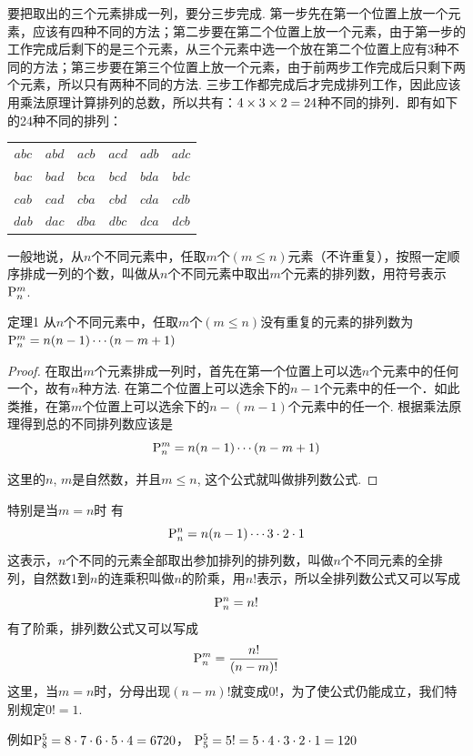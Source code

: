 \begin{solution}
要把取出的三个元素排成一列，要分三步完成. 第一步先在第一个位置上放一个元素，应该有四种不同的方法；第二步要在第二个位置上放一个元素，由于第一步的工作完成后剩下的是三个元素，从三个元素中选一个放在第二个位置上应有3种不同的方法；第三步要在第三个位置上放一个元素，由于前两步工作完成后只剩下两个元素，所以只有两种不同的方法. 三步工作都完成后才完成排列工作，因此应该用乘法原理计算排列的总数，所以共有：$4\times3\times2=24$种不同的排列．即有如下的24种不同的排列：
\begin{center}
\begin{tabular}{cccccc}
$abc$& $abd$& $acb$ &$acd$ &$adb$& $adc$\\
$bac$& $bad$ &$bca$& $bcd$ &$bda$& $bdc$\\
$cab$& $cad$ &$cba$& $cbd$ &$cda$& $cdb$\\
$dab$& $dac$& $dba$ &$dbc$& $dca$ &$dcb$    
\end{tabular}
\end{center}
\end{solution}

一般地说，从$n$个不同元素中，任取$m$个$(m\le n)$元素（不许重复），按照一定顺序排成一列的个数，叫做从$n$个不同元素中取出$m$个元素的排列数，用符号表示${\rm P}^{m}_{n}$.

\begin{blk}
  {定理1} 从$n$个不同元素中，任取$m$个$(m\le n)$没有重复的元素的排列数为${\rm P}^{m}_{n}=n(n-1)\cdots (n-m+1)$
\end{blk}

\begin{proof}
    在取出$m$个元素排成一列时，首先在第一个位置上可以选$n$个元素中的任何一个，故有$n$种方法. 在第二个位置上可以选余下的$n-1$个元素中的任一个．如此类推，在第$m$个位置上可以选余下的$n-(m-1)$个元素中的任一个. 根据乘法原理得到总的不同排列数应该是
\[{\rm P}^{m}_{n}=n(n-1)\cdots(n-m+1)\]

这里的$n$, $m$是自然数，并且$m\le n$, 这个公式就叫做排列数公式.
\end{proof}

特别是当$m=n$时 有
\[{\rm P}^{n}_{n}=n(n-1)\cdots3\cdot2\cdot1\]
这表示，$n$个不同的元素全部取出参加排列的排列数，叫做$n$个不同元素的全排列，自然数1到$n$的连乘积叫做$n$的阶乘，用$n!$表示，所以全排列数公式又可以写成
\[{\rm P}^{n}_{n}=n!\]
有了阶乘，排列数公式又可以写成
\[{\rm P}^{m}_{n}=\dfrac{n!}{(n-m)!}\]
这里，当$m=n$时，分母出现$(n-m)!$就变成$0!$，为了使公式仍能成立，我们特别规定$0!=1$.

例如${\rm P}^{5}_{8}=8\cdot  7\cdot 6\cdot 5\cdot 4=6720$，
${\rm P}^{5}_{5}=5!=5\cdot 4\cdot 3\cdot 2\cdot 1=120$

